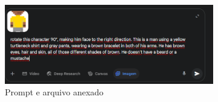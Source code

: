\begin{figure}[htbp]
    \centering
    \caption{\small Processo da geração 7 do sprite em side view no Gemini Pro em julho/2025}
    \label{fig:geminiPro7}

    \begin{subfigure}{0.8\linewidth}
        \includegraphics[width=1\linewidth]{figs/geminiPro/chat2/tela8.PNG}
        \caption{\small Prompt e arquivo anexado}
        \label{fig:geminiPro7Prompt}
    \end{subfigure}
    \begin{subfigure}{0.23\linewidth}

\end{subfigure}
\end{figure}
